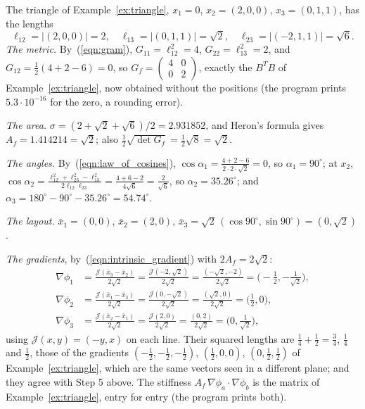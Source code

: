 \begin{example}
\label{ex:int_triangle}
The triangle of Example~\ref{ex:triangle}, $x_1 = 0$, $x_2 = (2, 0, 0)$, $x_3 = (0, 1, 1)$, has the lengths
\begin{equation*}
\ell_{12} = |(2, 0, 0)| = 2, \quad \ell_{13} = |(0, 1, 1)| = \sqrt 2, \quad \ell_{23} = |(-2, 1, 1)| = \sqrt 6 .
\end{equation*}
\emph{The metric.} By~(\ref{eqn:gram}), $G_{11} = \ell_{12}^2 = 4$, $G_{22} = \ell_{13}^2 = 2$, and $G_{12} = \frac12(4 + 2 - 6) = 0$, so $G_f = \left(\begin{smallmatrix} 4 & 0 \\ 0 & 2 \end{smallmatrix}\right)$, exactly the $B^T B$ of Example~\ref{ex:triangle}, now obtained without the positions (the program prints $5.3 \cdot 10^{-16}$ for the zero, a rounding error).

\emph{The area.} $\sigma = (2 + \sqrt 2 + \sqrt 6)/2 = 2.931852$, and Heron's formula gives $A_f = 1.414214 = \sqrt 2$; also $\frac12\sqrt{\det G_f} = \frac12\sqrt 8 = \sqrt 2$.

\emph{The angles.} By~(\ref{eqn:law_of_cosines}), $\cos\alpha_1 = \frac{4 + 2 - 6}{2\cdot 2\cdot\sqrt2} = 0$, so $\alpha_1 = 90^\circ$; at $x_2$, $\cos\alpha_2 = \frac{\ell_{12}^2 + \ell_{23}^2 - \ell_{13}^2}{2\ell_{12}\ell_{23}} = \frac{4 + 6 - 2}{4\sqrt6} = \frac{2}{\sqrt 6}$, so $\alpha_2 = 35.26^\circ$; and $\alpha_3 = 180^\circ - 90^\circ - 35.26^\circ = 54.74^\circ$.

\emph{The layout.} $\bar x_1 = (0, 0)$, $\bar x_2 = (2, 0)$, $\bar x_3 = \sqrt 2\,(\cos 90^\circ, \sin 90^\circ) = (0, \sqrt 2)$.

\emph{The gradients}, by~(\ref{eqn:intrinsic_gradient}) with $2A_f = 2\sqrt 2$:
\begin{align*}
\nabla\phi_1 &= \frac{\mathcal J(\bar x_3 - \bar x_2)}{2\sqrt2} = \frac{\mathcal J(-2, \sqrt 2)}{2\sqrt2} = \frac{(-\sqrt 2, -2)}{2\sqrt 2} = \Big(-\frac12, -\frac{1}{\sqrt2}\Big), \\
\nabla\phi_2 &= \frac{\mathcal J(\bar x_1 - \bar x_3)}{2\sqrt2} = \frac{\mathcal J(0, -\sqrt 2)}{2\sqrt2} = \frac{(\sqrt 2, 0)}{2\sqrt 2} = \Big(\frac12, 0\Big), \\
\nabla\phi_3 &= \frac{\mathcal J(\bar x_2 - \bar x_1)}{2\sqrt2} = \frac{\mathcal J(2, 0)}{2\sqrt2} = \frac{(0, 2)}{2\sqrt 2} = \Big(0, \frac{1}{\sqrt2}\Big),
\end{align*}
using $\mathcal J(x, y) = (-y, x)$ on each line. Their squared lengths are $\frac14 + \frac12 = \frac34$, $\frac14$ and $\frac12$, those of the gradients $(-\frac12, -\frac12, -\frac12)$, $(\frac12, 0, 0)$, $(0, \frac12, \frac12)$ of Example~\ref{ex:triangle}, which are the same vectors seen in a different plane; and they agree with Step 5 above. The stiffness $A_f\, \nabla\phi_a \cdot \nabla\phi_b$ is the matrix of Example~\ref{ex:triangle}, entry for entry (the program prints both).
\end{example}

